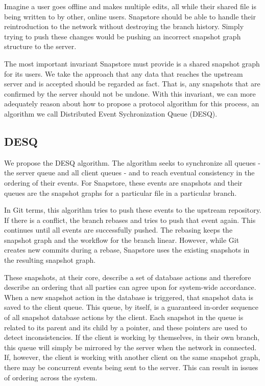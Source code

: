 Imagine a user goes offline and makes multiple edits, all while their shared file is being written to by other, online users. Snapstore should be able to handle their reintroduction to the network without destroying the branch history. Simply trying to push these changes would be pushing an incorrect snapshot graph structure to the server. 

The most important invariant Snapstore must provide is a shared snapshot graph for its users. We take the approach that any data that reaches the upstream server and is accepted should be regarded as fact. That is, any snapshots that are confirmed by the server should not be undone. With this invariant, we can more adequately reason about how to propose a protocol algorithm for this process, an algorithm we call Distributed Event Sychronization Queue (DESQ).

\subsection{DESQ} 

We propose the DESQ algorithm. The algorithm seeks to synchronize all queues - the server queue and all client queues - and to reach eventual consistency in the ordering of their events. For Snapstore, these events are snapshots and their queues are the snapshot graphs for a particular file in a particular branch. 

In Git terms, this algorithm tries to push these events to the upstream repository. If there is a conflict, the branch rebases and tries to push that event again. This continues until all events are successfully pushed. The rebasing keeps the snapshot graph and the workflow for the branch linear. However, while Git creates new commits during a rebase, Snapstore uses the existing snapshots in the resulting snapshot graph.

These snapshots, at their core, describe a set of database actions and therefore describe an ordering that all parties can agree upon for system-wide accordance. When a new snapshot action in the database is triggered, that snapshot data is saved to the client queue. This queue, by itself, is a guaranteed in-order sequence of all snapshot database actions by the client. Each snapshot in the queue is related to its parent and its child by a pointer, and these pointers are used to detect inconsistencies. If the client is working by themselves, in their own branch, this queue will simply be mirrored by the server when the network in connected. If, however, the client is working with another client on the same snapshot graph, there may be concurrent events being sent to the server. This can result in issues of ordering across the system.

